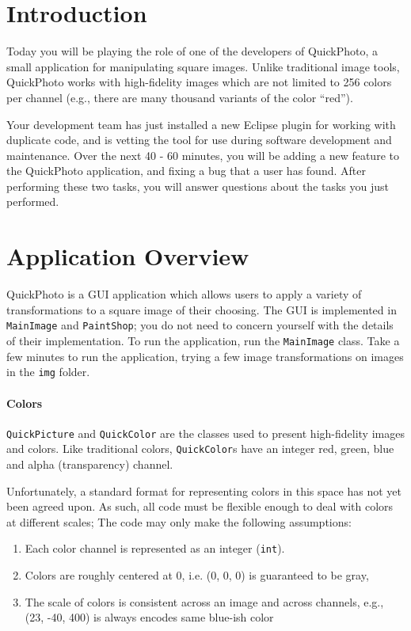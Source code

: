 \documentclass[12pt]{article}
\begin{document}
\maketitle

\section{Introduction}
Today you will be playing the role of one of the developers of
QuickPhoto, a small application for manipulating square images. Unlike
traditional image tools, QuickPhoto works with high-fidelity images
which are not limited to 256 colors per channel (e.g., there are many
thousand variants of the color ``red'').

Your
development team has just installed a new Eclipse plugin for working
with duplicate code, and is vetting the tool for use during software
development and maintenance. 
Over the next 40 - 60 minutes, you will be adding a new feature to the
QuickPhoto application, and fixing a bug that a user has found. After
performing these two tasks, you will answer questions about the tasks
you just performed.

\section{Application Overview}
QuickPhoto is a GUI application which allows users to apply a variety
of transformations to a square image of their choosing. The GUI is
implemented in \verb|MainImage| and \verb|PaintShop|; you do not need
to concern yourself with the details of their implementation. To run
the application, run the \verb|MainImage| class. Take a few minutes to
run the application, trying a few image transformations on images in the 
\verb|img| folder.

\paragraph{Colors}
\verb|QuickPicture| and \verb|QuickColor| are the classes used to
present high-fidelity images and colors.  Like traditional colors,
\verb|QuickColor|s have an integer red, green, blue and alpha
(transparency) channel.

Unfortunately, a standard format for representing colors in this space
has not yet been agreed upon.  As such, all code must be flexible
enough to deal with colors at different scales; The code may only make
the following assumptions:

\begin{enumerate}
\item Each color channel is represented as an integer (\verb|int|).
\item Colors are roughly centered at 0, i.e. (0, 0, 0) is guaranteed
  to be gray,
\item The scale of colors is consistent across an image and across
  channels, e.g., (23, -40, 400) is always encodes same blue-ish color
\end{enumerate}
\end{document}
